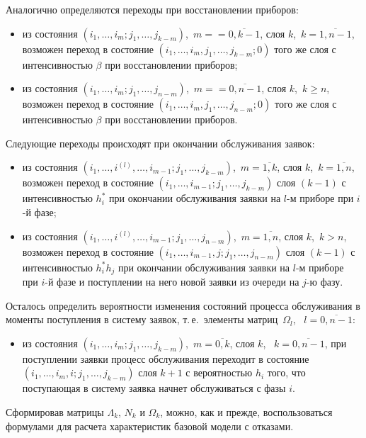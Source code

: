 \begin{multicols}{2}
Аналогично определяются переходы при восстановлении приборов:
\begin{itemize}
\item
из состояния
$(i_1,\ldots,i_{m};j_{1},\ldots,j_{k-m})$,\  $m=$\linebreak $=\overline{0,k-1}$,
слоя $k$,\ $k=\overline{1,n-1}$, возможен переход в состояние
$(i_1,\ldots,i_{m},j_{1},\ldots,j_{k-m};0)$
того же слоя с интенсивностью $\beta $ при восстановлении приборов;
\item
из состояния
$(i_1,\ldots,i_{m};j_{1},\ldots,j_{n-m})$,\ $m=$\linebreak $=\overline{0,n-1}$,
слоя $k$,\  $k\ge n$, возможен переход в состояние
$(i_1,\ldots,i_{m},j_{1},\ldots,j_{n-m};0)$
того же слоя с интенсивностью $\beta $ при восстановлении приборов.
\end{itemize}

Следующие переходы происходят при окончании обслуживания заявок:
\begin{itemize}
\item
из состояния
$(i_1,\ldots,i^{(l)}\!,\ldots,i_{m-1};j_{1},\ldots,j_{k-m})$,\
$m=\overline{1,k}$,
слоя $k$,\ $k=\overline{1,n}$, возможен переход в состояние
$(i_1,\ldots,i_{m-1};j_{1},\ldots,j_{k-m})$ слоя $(k-1)$ с
интенсивностью $h^*_i$ при окончании обслуживания заявки на $l$-м
приборе при $i$-й фазе;
\item
из состояния
$(i_1,\ldots,i^{(l)}\!,\ldots,i_{m-1};j_{1},\ldots,j_{n-m})$,\
$m=\overline{1,n}$,
слоя $k$,\ $k>n$, возможен переход в состояние
$(i_1,\ldots,i_{m-1},j;j_{1},\ldots,j_{n-m})$
слоя $(k-1)$ с интенсивностью $h^*_i h_{j}$ при окончании обслуживания
заявки на $l$-м приборе при $i$-й фазе и поступлении на него
новой заявки из очереди на $j$-ю фазу.
\end{itemize}

Осталось определить вероятности изменения состояний процесса
обслуживания в моменты поступления в систему заявок, т.\,е.\ элементы
мат\-риц~$\Omega_l$, \ $l=\overline{0,n-1}$:
\begin{itemize}
\item
из состояния
$(i_1,\ldots,i_{m};j_{1},\ldots,j_{k-m})$,\  $m=\overline{0,k}$,
слоя $k$, \ $k=\overline{0,n-1}$,
при поступлении заявки процесс обслуживания переходит в состояние
$(i_1,\ldots,i_{m},i;j_{1},\ldots,j_{k-m})$
слоя $k+1$ с ве\-ро\-ят\-ностью $h_i$ того, что поступающая в систему
заявка начнет обслуживаться с фазы $i$.
\end{itemize}

Сформировав матрицы $\Lambda_k$, $N_k$ и $\Omega_k$, можно, как и
прежде, воспользоваться формулами для расчета характеристик базовой
модели с отказами.


\end{multicols}
